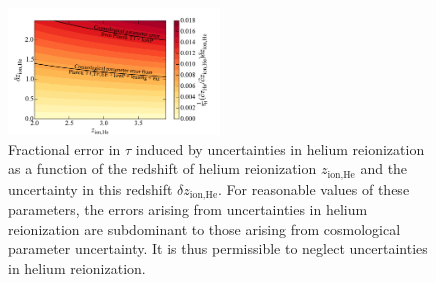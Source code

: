 \documentclass[twocolumn,aps,prd,nofootinbib,showpacs]{revtex4-1}
\begin{document}
\begin{figure}[!]
	\centering
	\includegraphics[width=0.5\textwidth,trim=0.5cm 0cm 0.75cm 0.90cm,clip]{figures/HeII_reion.pdf}
	\caption{Fractional error in $\tau$ induced by uncertainties in helium reionization as a function of the redshift of helium reionization $z_\textrm{ion,He}$ and the uncertainty in this redshift $\delta z_\textrm{ion,He}$. For reasonable values of these parameters, the errors arising from uncertainties in helium reionization are subdominant to those arising from cosmological parameter uncertainty. It is thus permissible to neglect uncertainties in helium reionization.}
	\label{fig:HeII_reion_errors}
\end{figure}
\end{document}
